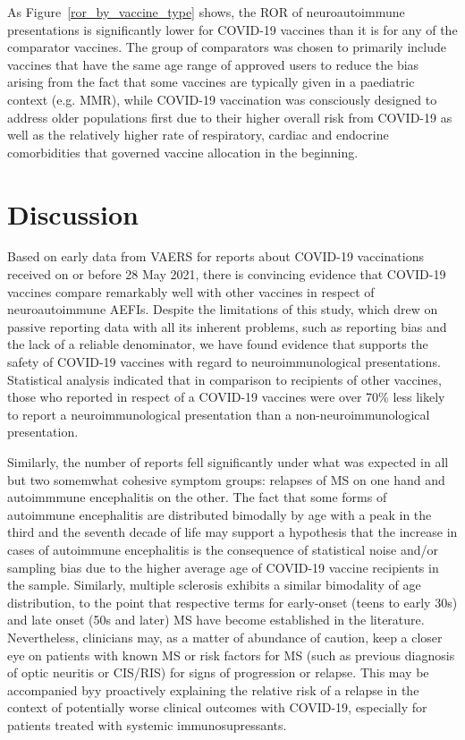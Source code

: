 \documentclass[idr,communication,submit,oneauthor,pdftex]{Definitions/mdpi}
\begin{document}
As Figure~\ref{ror_by_vaccine_type} shows, the ROR of neuroautoimmune presentations is significantly lower for COVID-19
vaccines than it is for any of the comparator vaccines. The group of comparators was chosen to primarily include
vaccines that have the same age range of approved users to reduce the bias arising from the fact that some vaccines
are typically given in a paediatric context (e.g. MMR), while COVID-19 vaccination was consciously designed to
address older populations first due to their higher overall risk from COVID-19 as well as the relatively higher rate
of respiratory, cardiac and endocrine comorbidities that governed vaccine allocation in the beginning.

\section{Discussion}

Based on early data from VAERS for reports about COVID-19 vaccinations received on or before 28 May 2021, there
is convincing evidence that COVID-19 vaccines compare remarkably well with other vaccines in respect of
neuroautoimmune AEFIs. Despite the limitations of this study, which drew on passive reporting data with all its
inherent problems, such as reporting bias and the lack of a reliable denominator, we have found evidence that supports
the safety of COVID-19 vaccines with regard to neuroimmunological presentations. Statistical analysis indicated that in
comparison to recipients of other vaccines, those who reported in respect of a COVID-19 vaccines were over 70\% less
likely to report a neuroimmunological presentation than a non-neuroimmunological presentation.

Similarly, the number of reports fell significantly under what was expected in all but two somemwhat cohesive symptom
groups: relapses of MS on one hand and autoimmmune encephalitis on the other. The fact that some forms of autoimmune
encephalitis are distributed bimodally by age with a peak in the third and the seventh decade of life may support a
hypothesis that the increase in cases of autoimmune encephalitis is the consequence of statistical noise and/or
sampling bias due to the higher average age of COVID-19 vaccine recipients in the sample.\cite{shan2021neuronal}
Similarly, multiple sclerosis exhibits a similar bimodality of age distribution, to the point that respective terms
for early-onset (teens to early 30s) and late onset (50s and later) MS have become established in the
literature.\cite{kis2008clinical} Nevertheless, clinicians may, as a matter of abundance of caution, keep a closer eye
on patients with known MS or risk factors for MS (such as previous diagnosis of optic neuritis or CIS/RIS) for signs
of progression or relapse. This may be accompanied byy proactively explaining the relative risk of a relapse in the
context of potentially worse clinical outcomes with COVID-19, especially for patients treated with systemic
immunosupressants.
\end{document}
